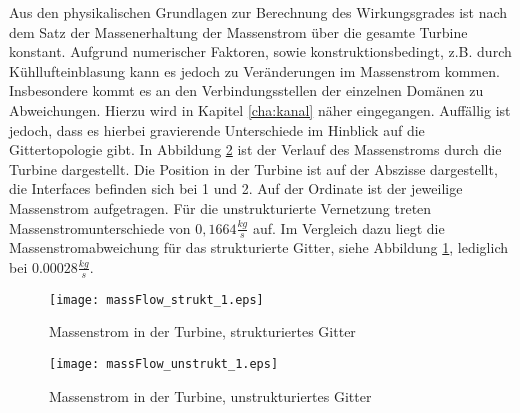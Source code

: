 Aus den physikalischen Grundlagen zur Berechnung des Wirkungsgrades ist nach dem Satz der Massenerhaltung der Massenstrom über die gesamte Turbine konstant.
Aufgrund numerischer Faktoren, sowie konstruktionsbedingt, z.B. durch Kühllufteinblasung kann es jedoch zu Veränderungen im Massenstrom kommen. 
Insbesondere kommt es an den Verbindungsstellen der einzelnen Domänen zu Abweichungen. Hierzu wird in Kapitel \ref{cha:kanal} näher eingegangen.
Auffällig ist jedoch, dass es hierbei gravierende Unterschiede im Hinblick auf die Gittertopologie gibt. In Abbildung \ref{fig:massFlowUnstrukt} ist der Verlauf des Massenstroms durch die Turbine dargestellt. Die Position in der Turbine ist auf der Abszisse dargestellt, die Interfaces befinden sich bei 1 und 2. Auf der Ordinate ist der jeweilige Massenstrom aufgetragen. Für die unstrukturierte Vernetzung treten Massenstromunterschiede von $0,1664 \frac{kg}{s}$ auf. Im Vergleich dazu liegt die Massenstromabweichung für das strukturierte Gitter, siehe Abbildung \ref{fig:massFlowStrukt}, lediglich bei $0.00028\frac{kg}{s}$.

 \begin{figure}[htbp]
	\centering
	\texttt{[image: massFlow\_strukt\_1.eps]}
	\caption{Massenstrom in der Turbine, strukturiertes Gitter} \label{fig:massFlowStrukt}
\end{figure} 
 \begin{figure}[htbp]
	\centering
	\texttt{[image: massFlow\_unstrukt\_1.eps]}
	\caption{Massenstrom in der Turbine, unstrukturiertes Gitter} \label{fig:massFlowUnstrukt}
\end{figure} 
